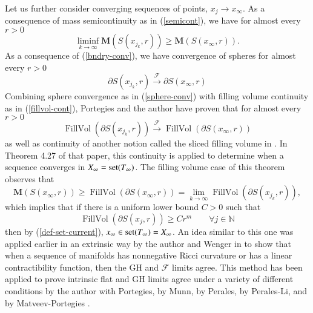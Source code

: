 \documentclass[12pt]{amsart}
\begin{document}
Let us further consider converging sequences of points, $x_j \to x_\infty$. 
As a consequence of mass semicontinuity as in (\ref{semicont}), we have
for almost every $r>0$
\begin{equation}\label{semi-ball}
\liminf_{k\to \infty} {{\mathbf M}}(S(x_{j_k}, r)) \ge {{\mathbf M}}( S(x_\infty, r)).
\end{equation}
As a consequence 
of (\ref{bndry-conv}), we have convergence of spheres
for almost every $r>0$
\begin{equation}  \label{sphere-conv}
\partial S(x_{j_k}, r) {\stackrel {\mathcal{F}}{\longrightarrow} } \partial S(x_\infty, r) 
\end{equation}
Combining sphere convergence as in (\ref{sphere-conv}) with 
filling volume continuity as in (\ref{fillvol-cont}), 
Portegies and the author have
proven that for almost every $r>0$
\begin{equation}  \label{sphere-fillvol-cont}
{\operatorname{FillVol}}(\partial S(x_{j_k}, r)) {\stackrel {\mathcal{F}}{\longrightarrow} } {\operatorname{FillVol}}(\partial S(x_\infty, r))
\end{equation}
as well as continuity of another notion called the sliced filling volume in \cite{Sormani-properties}.   In Theorem 4.27 of that paper, this continuity
is applied 
to determine when a sequence converges in $X_\infty={{\rm{set}}}(T_\infty)$.  
The filling volume case of this theorem observes that
\begin{equation} \label{conv-1}
{{\mathbf M}}(S(x_\infty, r)) \ge {\operatorname{FillVol}}(\partial S(x_\infty, r)) = \lim_{k\to \infty}
{\operatorname{FillVol}}(\partial S(x_{j_k}, r)),
\end{equation}
which implies that if there is a uniform lower bound $C>0$ such that
\begin{equation} \label{conv-2}
{\operatorname{FillVol}}(\partial S(x_{j}, r))\ge Cr^m \qquad \forall j\in {\mathbb{N}}
\end{equation}
then by
(\ref{def-set-current}), 
$x_\infty \in {{\rm{set}}}(T_\infty)=X_\infty $. 
An idea similar to this one was applied earlier in an extrinsic way by the 
author and Wenger in \cite{SorWen1} to show that when a sequence
of manifolds has nonnegative Ricci curvature or has a linear
contractibility function, then the GH and $\mathcal{F}$ limits
agree.  This method has been applied to prove intrinsic flat
and GH limits agree under a variety of different conditions by
the author with Portegies, by
Munn, by Perales, by Perales-Li,  and by Matveev-Portegies  
\cite{Sormani-properties} \cite{Munn-F=GH}   
 \cite{Perales-Conv} \cite{Li-Perales} \cite{Matveev-Portegies}.
\end{document}
